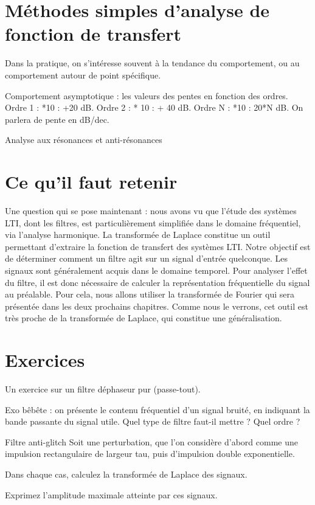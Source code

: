 \documentclass[]{book}
\begin{document}
{	
	\section{Méthodes simples d'analyse de fonction de transfert}
	Dans la pratique, on s'intéresse souvent à la tendance du comportement, ou au comportement autour de point spécifique.
	
	Comportement asymptotique : les valeurs des pentes en fonction des ordres. Ordre 1 : *10 : +20 dB. Ordre 2 : * 10 : + 40 dB. Ordre N : *10 : 20*N dB. On parlera de pente en dB/dec.
	
	Analyse aux résonances et anti-résonances
	
	
	\section{Ce qu'il faut retenir}
	Une question qui se pose maintenant : nous avons vu que l'étude des systèmes LTI, dont les filtres, est particulièrement simplifiée dans le domaine fréquentiel, via l'analyse harmonique. La transformée de Laplace constitue un outil permettant d'extraire la fonction de transfert des systèmes LTI.
	Notre objectif est de déterminer comment un filtre agit sur un signal d'entrée quelconque. Les signaux sont généralement acquis dans le domaine temporel. Pour analyser l'effet du filtre, il est donc nécessaire de calculer la représentation fréquentielle du signal au préalable. Pour cela, nous allons utiliser la transformée de Fourier qui sera présentée dans les deux prochains chapitres. Comme nous le verrons, cet outil est très proche de la transformée de Laplace, qui constitue une généralisation. 
	
	
	\section{Exercices }
	Un exercice sur un filtre déphaseur pur (passe-tout). 
	
	
	Exo bêbête : on présente le contenu fréquentiel d'un signal bruité, en indiquant la bande passante du signal utile. Quel type de filtre faut-il mettre ? Quel ordre ?
	
	Filtre anti-glitch
	Soit une perturbation, que l'on considère d'abord comme une impulsion rectangulaire de largeur tau, puis d'impulsion double exponentielle.
	
	Dans chaque cas, calculez la transformée de Laplace des signaux.
	
	Exprimez l'amplitude maximale atteinte par ces signaux.
	
}
\end{document}
